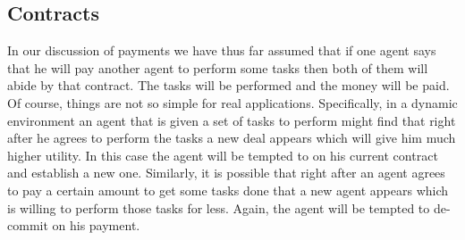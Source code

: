 



\subsection{Contracts}
\label{sec:contracts}

In our discussion of payments we have thus far assumed that if one
agent says that he will pay another agent to perform some tasks then
both of them will abide by that contract. The tasks will be performed
and the money will be paid. Of course, things are not so simple for
real applications. Specifically, in a dynamic environment an agent
that is given a set of tasks to perform might find that right after he
agrees to perform the tasks a new deal appears which will give him
much higher utility. In this case the agent will be tempted to
 on his current contract and establish a new one.
Similarly, it is possible that right after an agent agrees to pay a
certain amount to get some tasks done that a new agent appears which
is willing to perform those tasks for less. Again, the agent will be
tempted to de-commit on his payment.


